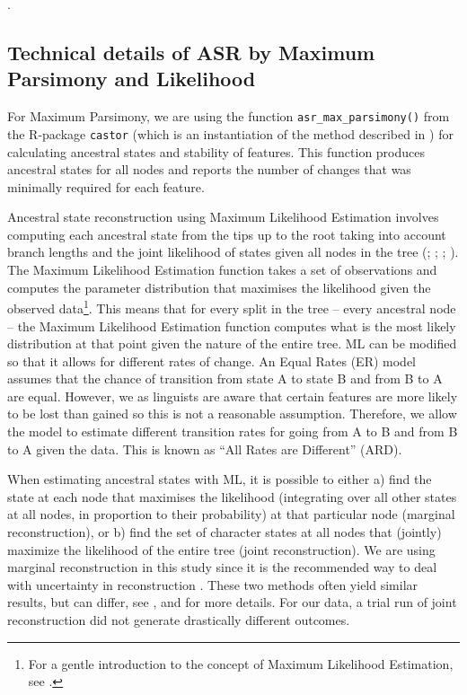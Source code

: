 \documentclass[12pt,letterpaper]{article}
\begin{document}
.

\FloatBarrier
\subsection{Technical details of ASR by Maximum Parsimony and Likelihood}
\label{supp:tech_details}

For Maximum Parsimony, we are using the function \texttt{asr\_max\_parsimony()} from the R-package \texttt{castor} \citep{louca2017efficient} (which is an instantiation of the method described in \citealt{sankoff1975minimal}) for calculating ancestral states and stability of features. This function produces ancestral states for all nodes and reports the number of changes that was minimally required for each feature. 

Ancestral state reconstruction using Maximum Likelihood Estimation involves computing each ancestral state from the tips up to the root taking into account branch lengths and the joint likelihood of states given all nodes in the tree (\citet{wilks1938large}; \citet{fisher1912absolute}; \citet{pagel1994detecting}; \citet{cunningham1998reconstructing}). The Maximum Likelihood Estimation function takes a set of observations and computes the parameter distribution that maximises the likelihood given the observed data\footnote{For a gentle introduction to the concept of Maximum Likelihood Estimation, see \citet{jonny_ML}.}. This means that for every split in the tree -- every ancestral node -- the Maximum Likelihood Estimation function computes what is the most likely distribution at that point given the nature of the entire tree. ML can be modified so that it allows for different rates of change. An Equal Rates (ER) model assumes that the chance of transition from state A to state B and from B to A are equal. However, we as linguists are aware that certain features are more likely to be lost than gained so this is not a reasonable assumption. Therefore, we allow the model to estimate different transition rates for going from A to B and from B to A given the data. This is known as ``All Rates are Different'' (ARD).

When estimating ancestral states with ML, it is possible to either a) find the state at each node that maximises the likelihood (integrating over all other states at all nodes, in proportion to their probability) at that particular node (marginal reconstruction), or b) find the set of character states at all nodes that (jointly) maximize the likelihood of the entire tree (joint reconstruction). We are using marginal reconstruction in this study since it is the recommended way to deal with uncertainty in reconstruction \citep{revell_2014}. These two methods often yield similar results, but can differ, see \citet[259-260]{felsenstein2004inferring},  \citet[121-126]{yang2006computational} and \citet[5]{joy2016ancestral} for more details. For our data, a trial run of joint reconstruction did not generate drastically different outcomes.
\end{document}
